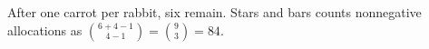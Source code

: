 After one carrot per rabbit, six remain. Stars and bars counts nonnegative allocations as $\binom{6+4-1}{4-1}=\binom 93=\boxed{84}$.
